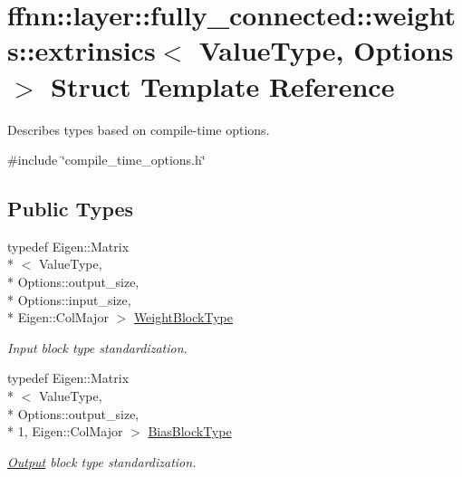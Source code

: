\hypertarget{structffnn_1_1layer_1_1fully__connected_1_1weights_1_1extrinsics}{\section{ffnn\-:\-:layer\-:\-:fully\-\_\-connected\-:\-:weights\-:\-:extrinsics$<$ Value\-Type, Options $>$ Struct Template Reference}
\label{structffnn_1_1layer_1_1fully__connected_1_1weights_1_1extrinsics}
}


Describes types based on compile-\/time options.  




{\ttfamily \#include \char`\"{}compile\-\_\-time\-\_\-options.\-h\char`\"{}}

\subsection*{Public Types}
\begin{DoxyCompactItemize}
\item 
typedef Eigen\-::\-Matrix\\*
$<$ Value\-Type, \\*
Options\-::output\-\_\-size, \\*
Options\-::input\-\_\-size, \\*
Eigen\-::\-Col\-Major $>$ \hyperlink{structffnn_1_1layer_1_1fully__connected_1_1weights_1_1extrinsics_a0c2c0299f0112bdcbcc72f9cf7af9bf6}{Weight\-Block\-Type}
\begin{DoxyCompactList}\small\item\em Input block type standardization. \end{DoxyCompactList}\item 
typedef Eigen\-::\-Matrix\\*
$<$ Value\-Type, \\*
Options\-::output\-\_\-size, \\*
1, Eigen\-::\-Col\-Major $>$ \hyperlink{structffnn_1_1layer_1_1fully__connected_1_1weights_1_1extrinsics_a7ea91263929a2b1b067b8c77a37f92a4}{Bias\-Block\-Type}
\begin{DoxyCompactList}\small\item\em \hyperlink{classffnn_1_1layer_1_1_output}{Output} block type standardization. \end{DoxyCompactList}\end{DoxyCompactItemize}


